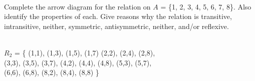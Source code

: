 \documentclass[a4paper,12pt]{book}
\newcounter{question}
\begin{document}
    \newpage

        
    \begin{questionNOGRADE}{\thequestion}

        ~\\
        Complete the arrow diagram for the relation on
        \small 
        $A$ = \{1, 2, 3, 4, 5, 6, 7, 8\}.
        \normalsize 
        Also identify the properties of each. Give reasons why the relation is
        transitive, intransitive, neither, symmetric, antisymmetric, neither, and/or
        reflexive.

        ~\\
        $ R_{2} $ = \{  (1,1), (1,3), (1,5), (1,7) \tab
                        (2,2), (2,4), (2,8), \\ \tab[1.3cm]
                        (3,3), (3,5), (3,7), \tab
                        (4,2), (4,4), (4,8), \tab
                        (5,3), (5,7), \\ \tab[1.3cm]
                        (6,6), (6,8), \tab
                        (8,2), (8,4), (8,8)
                 \}

\end{questionNOGRADE}
\end{document}

